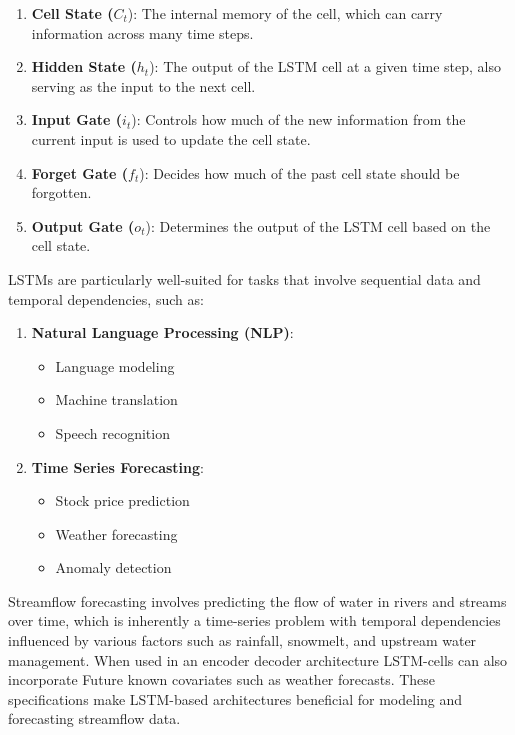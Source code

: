 \documentclass[
]{article}
\providecommand{\tightlist}{%
  \setlength{\itemsep}{0pt}\setlength{\parskip}{0pt}}
\begin{document}
\begin{enumerate}
\def\labelenumi{\arabic{enumi}.}
\tightlist
\item
  \textbf{Cell State (}\(C_t\)): The internal memory of the cell, which
  can carry information across many time steps.
\item
  \textbf{Hidden State (}\(h_t\)): The output of the LSTM cell at a
  given time step, also serving as the input to the next cell.
\item
  \textbf{Input Gate (}\(i_t\)): Controls how much of the new
  information from the current input is used to update the cell state.
\item
  \textbf{Forget Gate (}\(f_t\)): Decides how much of the past cell
  state should be forgotten.
\item
  \textbf{Output Gate (}\(o_t\)): Determines the output of the LSTM cell
  based on the cell state.
\end{enumerate}

LSTMs are particularly well-suited for tasks that involve sequential
data and temporal dependencies, such as:

\begin{enumerate}
\def\labelenumi{\arabic{enumi}.}
\tightlist
\item
  \textbf{Natural Language Processing (NLP)}:

  \begin{itemize}
  \tightlist
  \item
    Language modeling
  \item
    Machine translation
  \item
    Speech recognition
  \end{itemize}
\item
  \textbf{Time Series Forecasting}:

  \begin{itemize}
  \tightlist
  \item
    Stock price prediction
  \item
    Weather forecasting
  \item
    Anomaly detection
  \end{itemize}
\end{enumerate}

Streamflow forecasting involves predicting the flow of water in rivers
and streams over time, which is inherently a time-series problem with
temporal dependencies influenced by various factors such as rainfall,
snowmelt, and upstream water management. When used in an encoder decoder
architecture LSTM-cells can also incorporate Future known covariates
such as weather forecasts. These specifications make LSTM-based
architectures beneficial for modeling and forecasting streamflow data.
\end{document}
